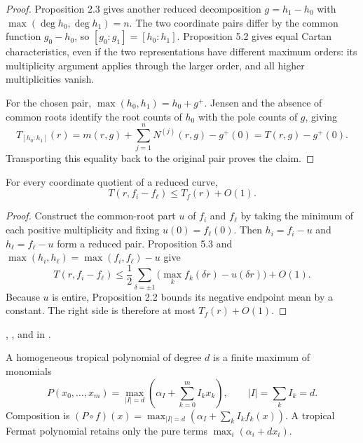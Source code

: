 \begin{proof}
\leanok
Proposition 2.3 gives another reduced decomposition $g=h_1-h_0$ with
$\max(\deg h_0,\deg h_1)=n$.  The two coordinate pairs differ by the common
function $g_0-h_0$, so $[g_0:g_1]=[h_0:h_1]$.  Proposition 5.2 gives equal
Cartan characteristics, even if the two representations have different
maximum orders: its multiplicity argument applies through the larger order,
and all higher multiplicities vanish.

For the chosen pair, $\max(h_0,h_1)=h_0+g^+$.  Jensen and the absence of
common roots identify the root counts of $h_0$ with the pole counts of $g$,
giving
\[
 T_{[h_0:h_1]}(r)
 =m(r,g)+\sum_{j=1}^{n}N^{(j)}(r,g)-g^+(0)
 =T(r,g)-g^+(0).
\]
Transporting this equality back to the original pair proves the claim.
\end{proof}

\begin{proposition}
\leanok
{}
For every coordinate quotient of a reduced curve,
\[
                       T(r,f_i-f_\ell)\leq T_f(r)+O(1).
\]
\end{proposition}

\begin{proof}
\leanok
Construct the common-root part $u$ of $f_i$ and $f_\ell$ by taking the
minimum of each positive multiplicity and fixing $u(0)=f_\ell(0)$.  Then
$h_i=f_i-u$ and $h_\ell=f_\ell-u$ form a reduced pair.  Proposition 5.3 and
$\max(h_i,h_\ell)=\max(f_i,f_\ell)-u$ give
\[
 T(r,f_i-f_\ell)
 \leq\frac12\sum_{\delta=\pm1}
   \bigl(\max_k f_k(\delta r)-u(\delta r)\bigr)+O(1).
\]
Because $u$ is entire, Proposition 2.2 bounds its negative endpoint mean by
a constant.  The right side is therefore at most $T_f(r)+O(1)$.
\end{proof}

\begin{leanproof}
,
, and
 in
.
\end{leanproof}

\begin{definition}
\leanok
{}
A homogeneous tropical polynomial of degree $d$ is a finite maximum of
monomials
\[
 P(x_0,\ldots,x_m)=\max_{|I|=d}
   \left(\alpha_I+\sum_{k=0}^m I_kx_k\right),
 \qquad |I|=\sum_kI_k=d.
\]
Composition is
$(P\circ f)(x)=\max_{|I|=d}(\alpha_I+\sum_kI_kf_k(x))$.  A tropical Fermat
polynomial retains only the pure terms $\max_i(\alpha_i+dx_i)$.
\end{definition}

